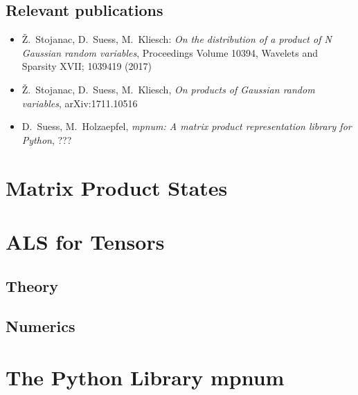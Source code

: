 


\subsection*{Relevant publications}
\begin{itemize}
  \item Ž.\ Stojanac, D.\ Suess, M.\ Kliesch: \textit{On the distribution of a product of N Gaussian random variables}, Proceedings Volume 10394, Wavelets and Sparsity XVII; 1039419 (2017)
  \item Ž.\ Stojanac, D.\ Suess, M.\ Kliesch, \textit{On products of Gaussian random variables}, arXiv:1711.10516
  \item D.\ Suess, M.\ Holzaepfel, \textit{mpnum: A matrix product representation library for Python}, ???
\end{itemize}
\section{Matrix Product States}
\label{sec:tensors.mps}


\section{ALS for Tensors}

\subsection{Theory}
\subsection{Numerics}

\section{The Python Library mpnum}

